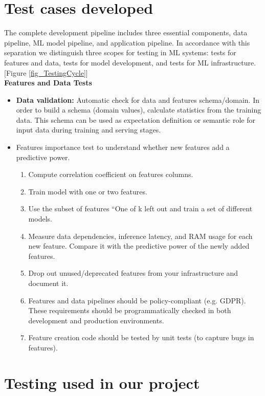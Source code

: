 \documentclass[12pt,oneside,a4paper]{report}
\begin{document}
\section{Test cases developed}
\fontsize{12pt}{10pt}\selectfont
The complete development pipeline includes three essential components, data pipeline, ML model pipeline, and application pipeline. In accordance with this separation we distinguish three scopes for testing in ML systems: tests for features and data, tests for model development, and tests for ML infrastructure.[Figure \ref{fig_TestingCycle}]\\
\Large{\textbf{Features and Data Tests}}\\
\fontsize{12pt}{10pt}\selectfont
\begin{itemize}
\item\textbf{Data validation:} Automatic check for data and features schema/domain. In order to build a schema (domain values), calculate statistics from the training data. This schema can be used as expectation definition or semantic role for input data during training and serving stages.
\item Features importance test to understand whether new features add a predictive power.
\begin{enumerate}

      	\item Compute correlation coefficient on features columns.
        \item Train model with one or two features.
        \item Use the subset of features “One of k left out and train a set of different models.
        \item Measure data dependencies, inference latency, and RAM usage for each new feature. Compare it with the predictive power of the newly added features.
        \item Drop out unused/deprecated features from your infrastructure and document it.

    \item Features and data pipelines should be policy-compliant (e.g. GDPR). These requirements should be programmatically checked in both development and production environments.
    \item Feature creation code should be tested by unit tests (to capture bugs in features).
\end{enumerate}
\end{itemize}
\newpage
\section{Testing used in our project}
\end{document}

